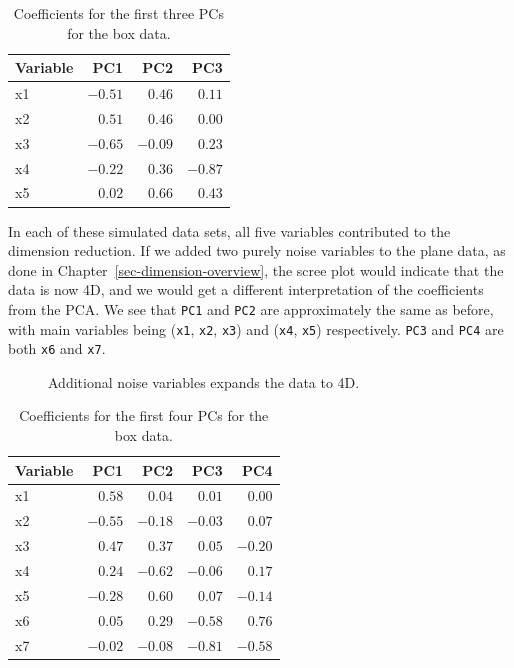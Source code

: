 \documentclass[
  letterpaper,
]{krantz}
\begin{document}
\begin{longtable}{lrrr}

\caption{\label{tbl-box-pcs}Coefficients for the first three PCs for the
box data.}

\tabularnewline

\toprule
Variable & PC1 & PC2 & PC3 \\ 
\midrule
x1 & $-0.51$ & $0.46$ & $0.11$ \\ 
x2 & $0.51$ & $0.46$ & $0.00$ \\ 
x3 & $-0.65$ & $-0.09$ & $0.23$ \\ 
x4 & $-0.22$ & $0.36$ & $-0.87$ \\ 
x5 & $0.02$ & $0.66$ & $0.43$ \\ 
\bottomrule

\end{longtable}

In each of these simulated data sets, all five variables contributed to
the dimension reduction. If we added two purely noise variables to the
plane data, as done in Chapter~\ref{sec-dimension-overview}, the scree
plot would indicate that the data is now 4D, and we would get a
different interpretation of the coefficients from the PCA. We see that
\texttt{PC1} and \texttt{PC2} are approximately the same as before, with
main variables being (\texttt{x1}, \texttt{x2}, \texttt{x3}) and
(\texttt{x4}, \texttt{x5}) respectively. \texttt{PC3} and \texttt{PC4}
are both \texttt{x6} and \texttt{x7}.

\begin{figure}


\caption{\label{fig-plane-noise-scree}Additional noise variables expands
the data to 4D.}

\end{figure}%

\begin{longtable}{lrrrr}

\caption{\label{tbl-plane-noise-pcs}Coefficients for the first four PCs
for the box data.}

\tabularnewline

\toprule
Variable & PC1 & PC2 & PC3 & PC4 \\ 
\midrule
x1 & $0.58$ & $0.04$ & $0.01$ & $0.00$ \\ 
x2 & $-0.55$ & $-0.18$ & $-0.03$ & $0.07$ \\ 
x3 & $0.47$ & $0.37$ & $0.05$ & $-0.20$ \\ 
x4 & $0.24$ & $-0.62$ & $-0.06$ & $0.17$ \\ 
x5 & $-0.28$ & $0.60$ & $0.07$ & $-0.14$ \\ 
x6 & $0.05$ & $0.29$ & $-0.58$ & $0.76$ \\ 
x7 & $-0.02$ & $-0.08$ & $-0.81$ & $-0.58$ \\ 
\bottomrule

\end{longtable}
\end{document}
